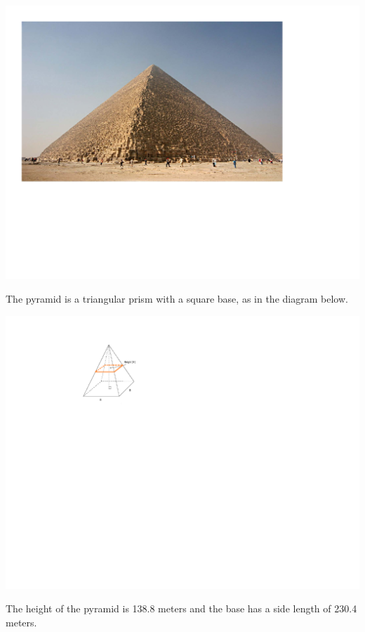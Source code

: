 \documentclass[12pt]{article}
\begin{document}
\begin{enumerate}
\begin{center}
\includegraphics[scale=0.45]{giza.pdf}
\end{center}

The pyramid is a triangular prism with a square base, as in the diagram below.  

\begin{center}
\includegraphics[scale=1.3]{pyramid.pdf}
\end{center}

The height of the pyramid is 138.8 meters and the base has a side length of 230.4 meters.  

\begin{enumerate} 


\end{enumerate}
\end{enumerate}
\end{document}
